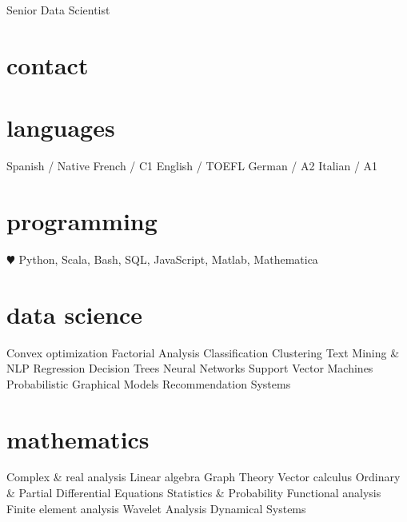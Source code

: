 \documentclass[]{friggeri-cv}
\begin{document}
       {Senior Data Scientist}


\begin{aside}
  \section{contact} 
  \makecvheader
  \section{languages}
    Spanish / Native
    French / C1
    English / TOEFL
    German / A2
    Italian / A1
  \section{programming}
    {\color{red}$\varheartsuit$} Python, Scala, 
    Bash, SQL, %
    JavaScript, %
    Matlab, Mathematica
   \section{data science}
   Convex optimization
   Factorial Analysis
   Classification
   Clustering
   Text Mining \& NLP
   Regression
   Decision Trees
   Neural Networks
   Support Vector Machines
   Probabilistic Graphical Models
   Recommendation Systems
   \section{mathematics}  
   Complex \& real analysis
   Linear algebra
   Graph Theory
   Vector calculus
   Ordinary \& Partial Differential Equations
   Statistics \& Probability
   Functional analysis
   Finite element analysis
   Wavelet Analysis
   Dynamical Systems
\end{aside}
\end{document}
